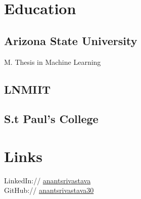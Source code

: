 \documentclass[hidelinks,letterpaper]{deedy-resume-openfont} %
\begin{document}
	\begin{minipage}[t]{0.33\textwidth} %
		
		
		\section{Education} 
		
		\subsection{Arizona State University}
		
        M. Thesis in Machine Learning\\
		
		
		\sectionsep
		
        
		\subsection{LNMIIT}
		
		
		\sectionsep
		
		
		\subsection{S.t Paul's College}
		
		
		\sectionsep
		
		\section{Links} 
		
		LinkedIn:// \href{https://www.linkedin.com/pub/anant-srivastava}{anantsrivastava} \\
		GitHub:// \href{https://github.com/anantsrivastava30/}{anantsrivastava30}
		

\end{minipage}
\end{document}
